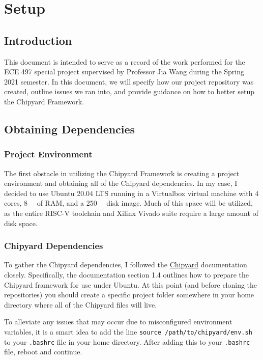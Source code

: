 \chapter{Setup}
\section{Introduction}
This document is intended to serve as a record of the work performed for the ECE 497 special project supervised by Professor Jia Wang during the Spring 2021 semester.
In this document, we will specify how our project repository was created, outline issues we ran into, and provide guidance on how to better setup the Chipyard Framework.

\section{Obtaining Dependencies}

\subsection{Project Environment}
The first obstacle in utilizing the Chipyard Framework is creating a project environment and obtaining all of the Chipyard dependencies.
In my case, I decided to use Ubuntu 20.04 LTS running in a Virtualbox virtual machine with 4 cores, \SI{8}{\giga\byte} of RAM, and a \SI{250}{\giga\byte} disk image.
Much of this space will be utilized, as the entire RISC-V toolchain and Xilinx Vivado suite require a large amount of disk space.

\subsection{Chipyard Dependencies}
To gather the Chipyard dependencies, I followed the \href{https://chipyard.readthedocs.io/en/latest/}{Chipyard} documentation closely.
Specifically, the documentation section 1.4 outlines how to prepare the Chipyard framework for use under Ubuntu.
At this point (and before cloning the repositories) you should create a specific project folder somewhere in your home directory where all of the Chipyard files will live.

To alleviate any issues that may occur due to misconfigured environment variables, it is a smart idea to add the line \texttt{source /path/to/chipyard/env.sh} to your \texttt{.bashrc} file in your home directory.
After adding this to your \texttt{.bashrc} file, reboot and continue.

